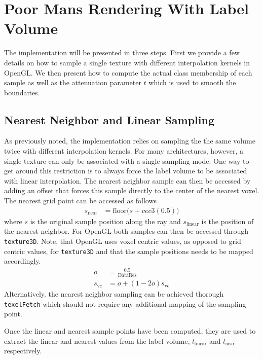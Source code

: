 \documentclass{egpubl}
\begin{document}
\section{Poor Mans Rendering With Label Volume}

The implementation will be presented in three steps. First we provide a few details on how to sample a single texture with different interpolation kernels in OpenGL. We then present how to compute the actual class membership of each sample as well as the attenuation parameter $t$ which is used to smooth the boundaries. 

\subsection*{Nearest Neighbor and Linear Sampling}

As previously noted, the implementation relies on sampling the the same volume twice with different interpolation kernels. For many architectures, however, a single texture can only be associated with a single sampling mode. One way to get around this restriction is to always force the label volume to be associated with linear interpolation. The nearest neighbor sample can then be accessed by adding an offset that forces this sample directly to the center of the nearest voxel. The nearest grid point can be accessed as follows
\begin{align}
s_\mathrm{near} &= \mathrm{floor}\big(s + vec3(0.5)\big) \label{eq:near}  
\end{align}
where $s$ is the original sample position along the ray and $s_\mathrm{linear}$ is the position of the nearest neighbor. For OpenGL both samples can then be accessed through \texttt{texture3D}. Note, that OpenGL uses voxel centric values, as opposed to grid centric values, for \texttt{texture3D} and that the sample positions needs to be mapped accordingly.
\begin{align}
o &= \frac{0.5}{\mathrm{DataRes}}\\
s_\mathrm{vc} &= o + (1 - 2o) s_\mathrm{vc}
\end{align}
 Alternatively. the nearest neighbor sampling can be achieved thorough \texttt{texelFetch} which should not require any additional mapping of the sampling point.

Once the linear and nearest sample points have been computed, they are used to extract the linear and nearest values from the label volume, $l_\mathrm{linear}$ and $l_\mathrm{near}$ respectively.
\end{document}
